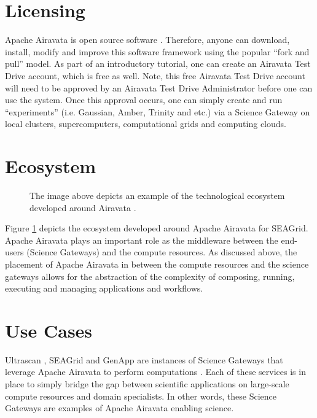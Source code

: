 \documentclass[9pt,twocolumn,twoside]{styles/osajnl}
\begin{document}
\section{Licensing} \label{licensing}
Apache Airavata is open source software \cite{www-source}. Therefore,
anyone can download, install, modify and improve this software
framework using the popular ``fork and pull'' model. As part of an
introductory tutorial, one can create an Airavata Test Drive account,
which is free as well. Note, this free Airavata Test Drive account
will need to be approved by an Airavata Test Drive Administrator
before one can use the system. Once this approval occurs, one can
simply create and run ``experiments'' (i.e. Gaussian, Amber, Trinity
and etc.) via a Science Gateway on local clusters, supercomputers,
computational grids and computing clouds.

\section{Ecosystem} \label{ecosystem}
\begin{figure}[htbp]
\centering
{}
\caption{The image above depicts an example of the technological
  ecosystem developed around Airavata \cite{www-airavata-ecosystem}.}
\label{fig:airavata-ecosystem}
\end{figure}
Figure \ref{fig:airavata-ecosystem} depicts the ecosystem developed
around Apache Airavata for SEAGrid. Apache Airavata plays an important role as the
middleware between the end-users (Science Gateways) and the compute
resources. As discussed above, the placement of Apache Airavata in
between the compute resources and the science gateways allows for the
abstraction of the complexity of composing, running, executing and
managing applications and workflows.

\section{Use Cases} \label{use}
Ultrascan \cite{www-ultrascan}, SEAGrid \cite{www-seagrid} and GenApp
\cite{www-genapp} are instances of Science Gateways that leverage
Apache Airavata to perform computations \cite{www-airavata}. Each of
these services is in place to simply bridge the gap between
scientific applications on large-scale compute resources and domain
specialists. In other words, these Science Gateways are examples of
Apache Airavata enabling science.
\end{document}
